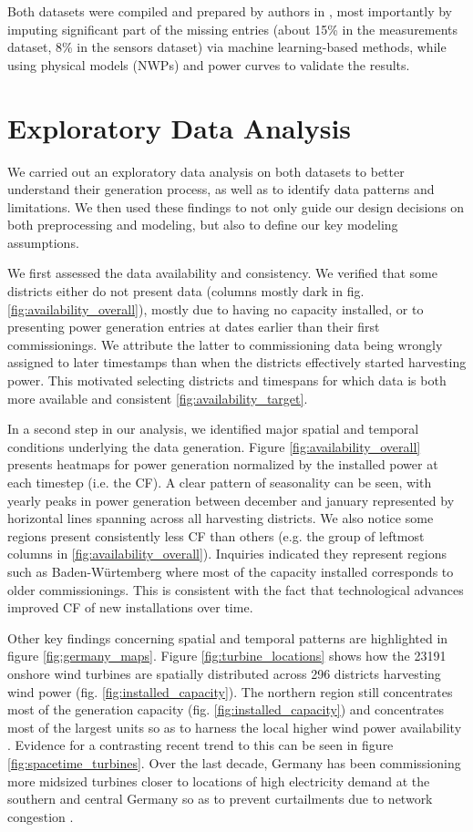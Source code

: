 Both datasets were compiled and prepared by authors in \cite{becker2017completion}, most importantly by imputing significant part of the missing entries (about 15\% in the measurements dataset, 8\% in the sensors dataset) via machine learning-based methods, while using physical models (NWPs) and power curves to validate the results.

\section{Exploratory Data Analysis}\label{sec:eda}
We carried out an exploratory data analysis on both datasets to better understand their generation process, as well as to identify data patterns and limitations.
We then used these findings to not only guide our design decisions on both preprocessing and modeling, but also to define our key modeling assumptions.

We first assessed the data availability and consistency.
We verified that some districts either do not present data (columns mostly dark in fig. \ref{fig:availability_overall}), mostly due to having no capacity installed, or to presenting power generation entries at dates earlier than their first commissionings.
We attribute the latter to commissioning data being wrongly assigned to later timestamps than when the districts effectively started harvesting power.
This motivated selecting districts and timespans for which data is both more available and consistent \ref{fig:availability_target}.

In a second step in our analysis, we identified major spatial and temporal conditions underlying the data generation.
Figure \ref{fig:availability_overall} presents heatmaps for power generation normalized by the installed power at each timestep (i.e. the CF).
A clear pattern of seasonality can be seen, with yearly peaks in power generation between december and january represented by horizontal lines spanning across all harvesting districts.
We also notice some regions present consistently less CF than others (e.g. the group of leftmost columns in \ref{fig:availability_overall}).
Inquiries indicated they represent regions such as Baden-Würtemberg where most of the capacity installed corresponds to older commissionings.
This is consistent with the fact that technological advances improved CF of new installations over time.

Other key findings concerning spatial and temporal patterns are highlighted in figure \ref{fig:germany_maps}.
Figure \ref{fig:turbine_locations} shows how the 23191 onshore wind turbines are spatially distributed across 296 districts harvesting wind power (fig. \ref{fig:installed_capacity}).
The northern region still concentrates most of the generation capacity (fig. \ref{fig:installed_capacity}) and concentrates most of the largest units so as to harness the local higher wind power availability \cite{windatlas}.
Evidence for a contrasting recent trend to this can be seen in figure \ref{fig:spacetime_turbines}.
Over the last decade, Germany has been commissioning more midsized turbines closer to locations of high electricity demand at the southern and central Germany so as to prevent curtailments due to network congestion \cite{engeland2017variability}.

